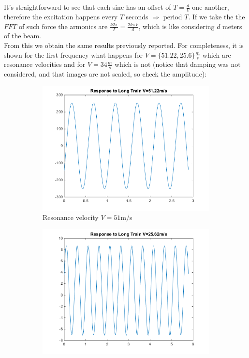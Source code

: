 \documentclass[10pt,a4paper,final]{report}
\begin{document}
\\ \\
It's straightforward to see that each sine has an offset of $T=\frac{d}{V}$ one another, therefore the excitation happens every $T$ seconds $\Rightarrow $ period $T$. If we take the the $FFT$ of such force the armonics are $\frac{k2\pi}{T} = \frac{2k\pi V}{d}$, which is like considering $d$ meters of the beam.\\
From this we obtain the same results previously reported.\newpage
For completeness, it is shown for the first frequency what happens for $V=\{51.22 ,25.6\} \frac{m}{s}$ which are resonance velocities and for $V=34 \frac{m}{s}$ which is not (notice that damping was not considered, and that images are not scaled, so check the amplitude):

\begin{figure}[h]
        \centering
        \begin{subfigure}[t]{0.5\textwidth}
                \includegraphics[width=\textwidth]{train4}
                \caption{Resonance velocity $V=51$m/s}
                \label{fig:earthquake4}
        \end{subfigure}%
        \begin{subfigure}[t]{0.5\textwidth}
                \includegraphics[width=\textwidth]{train5}

\end{subfigure}
\end{figure}
\end{document}
